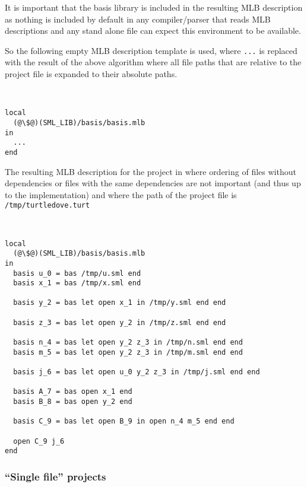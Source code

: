 It is important that the basis library is included in the resulting MLB
description as nothing is included by default in any compiler/parser that reads
MLB descriptions and any stand alone file can expect this environment to be
available.

So the following empty MLB description template is used, where \texttt{...} is
replaced with the result of the above algorithm where all file paths that are
relative to the project file is expanded to their absolute paths.

\begin{example}\
\label{ex:empty-mlb-description}
\begin{lstlisting}
local
  (@\$@)(SML_LIB)/basis/basis.mlb
in
  ...
end
\end{lstlisting}
\end{example}

The resulting MLB description for the project in
 where ordering of files without
dependencies or files with the same dependencies are not important (and thus up
to the implementation) and where the path of the project file is \texttt{/tmp/turtledove.turt}

\begin{example}\
\begin{lstlisting}
local
  (@\$@)(SML_LIB)/basis/basis.mlb
in
  basis u_0 = bas /tmp/u.sml end
  basis x_1 = bas /tmp/x.sml end

  basis y_2 = bas let open x_1 in /tmp/y.sml end end
  
  basis z_3 = bas let open y_2 in /tmp/z.sml end end

  basis n_4 = bas let open y_2 z_3 in /tmp/n.sml end end
  basis m_5 = bas let open y_2 z_3 in /tmp/m.sml end end
  
  basis j_6 = bas let open u_0 y_2 z_3 in /tmp/j.sml end end

  basis A_7 = bas open x_1 end
  basis B_8 = bas open y_2 end

  basis C_9 = bas let open B_9 in open n_4 m_5 end end

  open C_9 j_6
end
\end{lstlisting}  
\end{example}


\subsubsection{``Single file'' projects}

